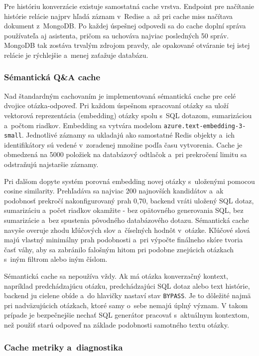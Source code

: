 \documentclass[a4paper, 12pt]{article}
\begin{document}
Pre históriu konverzácie existuje samostatná cache vrstva. Endpoint pre načítanie histórie relácie najprv hľadá záznam v~Redise a~až pri cache miss načítava dokument z~MongoDB. Po každej úspešnej odpovedi sa do cache doplní správa používateľa aj asistenta, pričom sa uchováva najviac posledných 50 správ. MongoDB tak zostáva trvalým zdrojom pravdy, ale opakované otváranie tej istej relácie je rýchlejšie a~menej zaťažuje databázu.

\subsubsection{Sémantická Q\&A cache}

Nad štandardným cachovaním je implementovaná sémantická cache pre celé dvojice otázka-odpoveď. Pri každom úspešnom spracovaní otázky sa uloží vektorová reprezentácia (embedding) otázky spolu s~SQL dotazom, sumarizáciou a~počtom riadkov. Embedding sa vytvára modelom \texttt{azure.text-embedding-3-small}. Jednotlivé záznamy sa ukladajú ako samostatné Redis objekty a~ich identifikátory sú vedené v~zoradenej množine podľa času vytvorenia. Cache je obmedzená na 5000 položiek na databázový odtlačok a~pri prekročení limitu sa odstraňujú najstaršie záznamy.

Pri ďalšom dopyte systém porovná embedding novej otázky s~uloženými pomocou cosine similarity. Prehľadáva sa najviac 200 najnovších kandidátov a~ak podobnosť prekročí nakonfigurovaný prah 0,70, backend vráti uložený SQL dotaz, sumarizáciu a~počet riadkov okamžite - bez opätovného generovania SQL, bez sumarizácie a~bez spustenia pôvodného databázového dotazu. Sémantická cache navyše overuje zhodu kľúčových slov a~číselných hodnôt v~otázke. Kľúčové slová majú vlastný minimálny prah podobnosti a~pri výpočte finálneho skóre tvoria časť váhy, aby sa zabránilo falošným hitom pri podobne znejúcich otázkach s~iným filtrom alebo iným číslom.

Sémantická cache sa nepoužíva vždy. Ak má otázka konverzačný kontext, napríklad predchádzajúcu otázku, predchádzajúci SQL dotaz alebo text histórie, backend ju cielene obíde a~do hlavičky nastaví stav \texttt{BYPASS}. Je to dôležité najmä pri nadväzujúcich otázkach, ktoré samy o~sebe nemajú úplný význam. V takom prípade je bezpečnejšie nechať SQL generátor pracovať s~aktuálnym kontextom, než použiť starú odpoveď na základe podobnosti samotného textu otázky.

\subsubsection{Cache metriky a~diagnostika}
\end{document}
